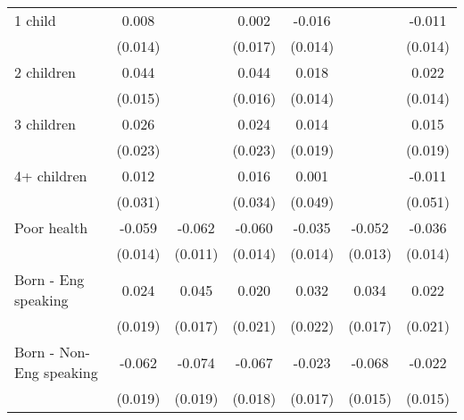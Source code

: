{\begin{tabular}{l*{6}{c}}
1 child             &       0.008         &                     &       0.002         &      -0.016         &                     &      -0.011         \\
                    &     (0.014)         &                     &     (0.017)         &     (0.014)         &                     &     (0.014)         \\
2 children          &       0.044\sym{***}&                     &       0.044\sym{***}&       0.018         &                     &       0.022         \\
                    &     (0.015)         &                     &     (0.016)         &     (0.014)         &                     &     (0.014)         \\
3 children          &       0.026         &                     &       0.024         &       0.014         &                     &       0.015         \\
                    &     (0.023)         &                     &     (0.023)         &     (0.019)         &                     &     (0.019)         \\
4+ children         &       0.012         &                     &       0.016         &       0.001         &                     &      -0.011         \\
                    &     (0.031)         &                     &     (0.034)         &     (0.049)         &                     &     (0.051)         \\
Poor health         &      -0.059\sym{***}&      -0.062\sym{***}&      -0.060\sym{***}&      -0.035\sym{**} &      -0.052\sym{***}&      -0.036\sym{**} \\
                    &     (0.014)         &     (0.011)         &     (0.014)         &     (0.014)         &     (0.013)         &     (0.014)         \\
Born - Eng speaking &       0.024         &       0.045\sym{***}&       0.020         &       0.032         &       0.034\sym{**} &       0.022         \\
                    &     (0.019)         &     (0.017)         &     (0.021)         &     (0.022)         &     (0.017)         &     (0.021)         \\
Born - Non-Eng speaking&      -0.062\sym{***}&      -0.074\sym{***}&      -0.067\sym{***}&      -0.023         &      -0.068\sym{***}&      -0.022         \\
                    &     (0.019)         &     (0.019)         &     (0.018)         &     (0.017)         &     (0.015)         &     (0.015)         \\

\end{tabular}}
